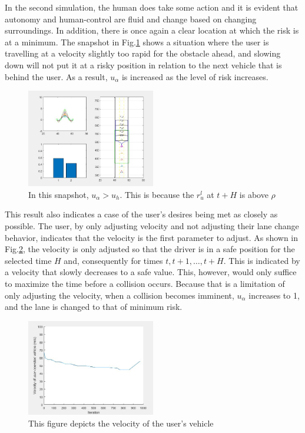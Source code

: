 \documentclass[letterpaper, 10 pt, conference]{ieeeconf}  %
\begin{document}
In the second simulation, the human does take some action and it is evident that autonomy and human-control are fluid and change based on changing surroundings. In addition, there is once again a clear location at which the risk is at a minimum. The snapshot in Fig.\ref{fig:cs2} shows a situation where the user is travelling at a velocity slightly too rapid for the obstacle ahead, and slowing down will not put it at a risky position in relation to the next vehicle that is behind the user. As a result, $u_{\alpha}$ is increased as the level of risk increases.

\begin{figure}[ht]
    \includegraphics[width=0.5\textwidth]{cs2.JPG}
    \caption{In this snapshot, $u_{\alpha} > u_{h}$. This is because the $r^l_u$ at $t+H$ is above $\rho$}
    \label{fig:cs2}
\end{figure}

This result also indicates a case of the user's desires being met as closely as possible. The user, by only adjusting velocity and not adjusting their lane change behavior, indicates that the velocity is the first parameter to adjust. As shown in Fig.\ref{fig:cs2c}, the velocity is only adjusted so that the driver is in a safe position for the selected time $H$ and, consequently for times $t,t+1,\ldots,t+H$. This is indicated by a velocity that slowly decreases to a safe value. This, however, would only suffice to maximize the time before a collision occurs. Because that is a limitation of only adjusting the velocity, when a collision becomes imminent, $u_\alpha$ increases to 1, and the lane is changed to that of minimum risk.

\begin{figure}[ht]
    \includegraphics[width=0.5\textwidth]{cs2c.JPG}
    \caption{This figure depicts the velocity of the user's vehicle}
    \label{fig:cs2c}
\end{figure}
\end{document}
